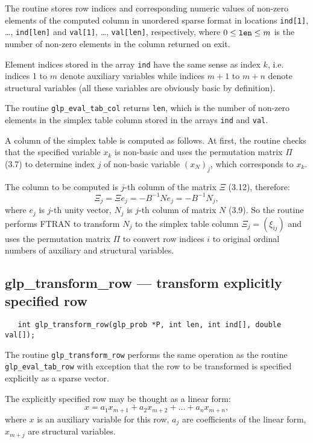The routine stores row indices and corresponding numeric values of
non-zero elements of the computed column in unordered sparse format in
locations \verb|ind[1]|, \dots, \verb|ind[len]| and \verb|val[1]|,
\dots, \verb|val[len]|, respectively, where $0\leq{\tt len}\leq m$ is
the number of non-zero elements in the column returned on exit.

Element indices stored in the array \verb|ind| have the same sense as
index $k$, i.e. indices 1 to $m$ denote auxiliary variables while
indices $m+1$ to $m+n$ denote structural variables (all these variables
are obviously basic by definition).

\returns

The routine \verb|glp_eval_tab_col| returns \verb|len|, which is the
number of non-zero elements in the simplex table column stored in the
arrays \verb|ind| and \verb|val|.


A column of the simplex table is computed as follows. At first, the
routine checks that the specified variable $x_k$ is non-basic and uses
the permutation matrix $\Pi$ (3.7) to determine index $j$ of non-basic
variable $(x_N)_j$, which corresponds to $x_k$.

The column to be computed is $j$-th column of the matrix $\Xi$ (3.12),
therefore:
$$\Xi_j=\Xi e_j=-B^{-1}Ne_j=-B^{-1}N_j,$$
where $e_j$ is $j$-th unity vector, $N_j$ is $j$-th column of matrix
$N$ (3.9). So the routine performs FTRAN to transform $N_j$ to the
simplex table column $\Xi_j=(\xi_{ij})$ and uses the permutation matrix
$\Pi$ to convert row indices $i$ to original ordinal numbers of
auxiliary and structural variables.

\subsection{glp\_transform\_row --- transform explicitly specified row}

\synopsis

\begin{verbatim}
   int glp_transform_row(glp_prob *P, int len, int ind[], double val[]);
\end{verbatim}

\description

The routine \verb|glp_transform_row| performs the same operation as the
routine \verb|glp_eval_tab_row| with exception that the row to be
transformed is specified explicitly as a sparse vector.

The explicitly specified row may be thought as a linear form:
$$x=a_1x_{m+1}+a_2x_{m+2}+\dots+a_nx_{m+n},$$
where $x$ is an auxiliary variable for this row, $a_j$ are coefficients
of the linear form, $x_{m+j}$ are structural variables.

